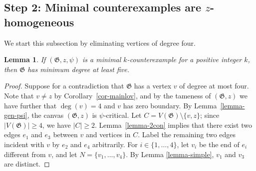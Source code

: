 \documentclass{article}
\newcommand\g{\mathfrak{G}}
\newtheorem{lemma}[theorem]{Lemma}
\begin{document}
\subsection{Step 2: Minimal counterexamples are $z$-homogeneous}\label{subsec:z-homog}
We start this subsection by eliminating vertices of degree four.
\begin{lemma}\label{lemma-gen-no4}
If $(\g,z,\psi)$ is a minimal $k$-counterexample for a positive integer $k$, then $\g$ has minimum degree at least five.
\end{lemma}
\begin{proof}
Suppose for a contradiction that $\g$ has a vertex $v$ of degree at most four.  Note that $v\neq z$ by Corollary~\ref{cor-mainlov}, and by the tameness of $(\g,z)$ we have further that $\deg(v)=4$ and $v$ has zero boundary.
By Lemma~\ref{lemma-gen-psi}, the canvas $(\g, z)$ is $\psi$-critical.  Let $C=V(\g)\setminus\{v,z\}$; since $|V(\g)|\ge 4$, we have $|C|\ge 2$.
Lemma~\ref{lemma-2con} implies that there exist two edges $e_1$ and $e_3$ between $v$ and vertices in $C$. 
Label the remaining two edges incident with $v$ by $e_2$ and $e_4$ arbitrarily.  For $i\in\{1,\ldots,4\}$, let $v_i$ be the end of $e_i$ different from $v$,
and let $N=\{v_1,\ldots, v_4\}$. By Lemma \ref{lemma-simple}, $v_1$ and $v_3$ are distinct.
 




\end{proof}
\end{document}
